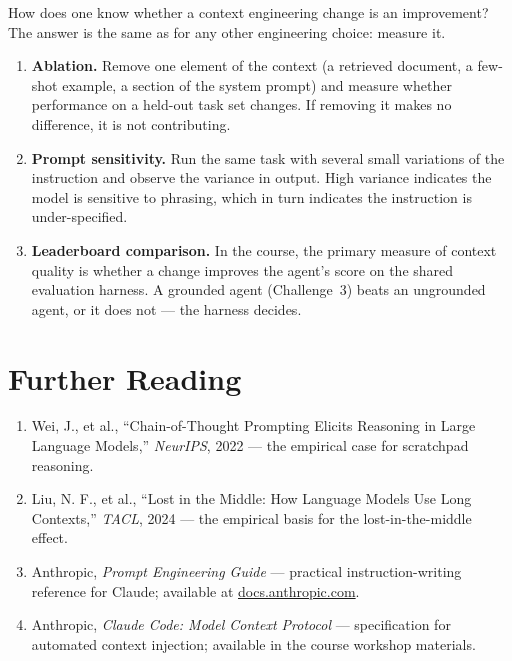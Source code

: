 How does one know whether a context engineering change is an improvement?
The answer is the same as for any other engineering choice: measure it.

\begin{enumerate}
\item \textbf{Ablation.} Remove one element of the context (a retrieved document, a few-shot example, a section of the system prompt) and measure whether performance on a held-out task set changes.
If removing it makes no difference, it is not contributing.

\item \textbf{Prompt sensitivity.} Run the same task with several small variations of the instruction and observe the variance in output.
High variance indicates the model is sensitive to phrasing, which in turn indicates the instruction is under-specified.

\item \textbf{Leaderboard comparison.} In the course, the primary measure of context quality is whether a change improves the agent's score on the shared evaluation harness.
A grounded agent (Challenge~3) beats an ungrounded agent, or it does not — the harness decides.
\end{enumerate}

\section*{Further Reading}

\begin{small}
\begin{enumerate}
\item Wei, J., et al., ``Chain-of-Thought Prompting Elicits Reasoning in Large Language Models,'' \emph{NeurIPS}, 2022 — the empirical case for scratchpad reasoning.
\item Liu, N. F., et al., ``Lost in the Middle: How Language Models Use Long Contexts,'' \emph{TACL}, 2024 — the empirical basis for the lost-in-the-middle effect.
\item Anthropic, \emph{Prompt Engineering Guide} — practical instruction-writing reference for Claude; available at \href{https://docs.anthropic.com/prompt-engineering}{docs.anthropic.com}.
\item Anthropic, \emph{Claude Code: Model Context Protocol} — specification for automated context injection; available in the course workshop materials.
\end{enumerate}
\end{small}
